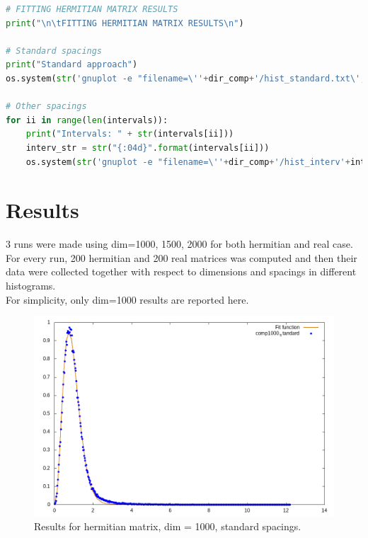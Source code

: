 \documentclass[12pt, a4paper, notitlepage]{report}
\begin{document}
\begin{lstlisting}[language=Python]
# FITTING HERMITIAN MATRIX RESULTS
print("\n\tFITTING HERMITIAN MATRIX RESULTS\n")

# Standard spacings
print("Standard approach")
os.system(str('gnuplot -e "filename=\''+dir_comp+'/hist_standard.txt\'; fit_log=\''+dir_comp+'/fit_comp_standard.log\'; img_name=\''+dir_comp+'/hist_standard_fit\'; fit_save=\''+dir_comp+'/fit_comp_standard_res.txt\'; data_title=\'comp'+str(dim_)+'_standard\'" "gnu_fit.gnu"'))

# Other spacings
for ii in range(len(intervals)):
	print("Intervals: " + str(intervals[ii]))
	interv_str = str("{:04d}".format(intervals[ii]))
	os.system(str('gnuplot -e "filename=\''+dir_comp+'/hist_interv'+interv_str+'.txt\'; fit_log=\''+dir_comp+'/fit_comp_interv'+interv_str+'.log\'; img_name=\''+dir_comp+'/hist_interval_'+interv_str+'_fit\'; fit_save=\''+dir_comp+'/fit_comp_interv'+interv_str+'_res.txt\'; data_title=\'comp'+str(dim_)+' interval '+interv_str+'\'" "gnu_fit.gnu"'))

\end{lstlisting}

\newpage

\section*{Results}
3 runs were made using dim=1000, 1500, 2000 for both hermitian and real case. For every run, 200 hermitian and 200 real matrices was computed and then their data were collected together with respect to dimensions and spacings in different histograms.\\
For simplicity, only dim=1000 results are reported here.



\begin{figure}[H]
	\centering
	\includegraphics[scale=0.6]{./Comp_1000/hist_standard_fit.png}
	\caption{Results for hermitian matrix, dim = 1000, standard spacings.}
	\label{figure_lambdas}
\end{figure}
\end{document}
